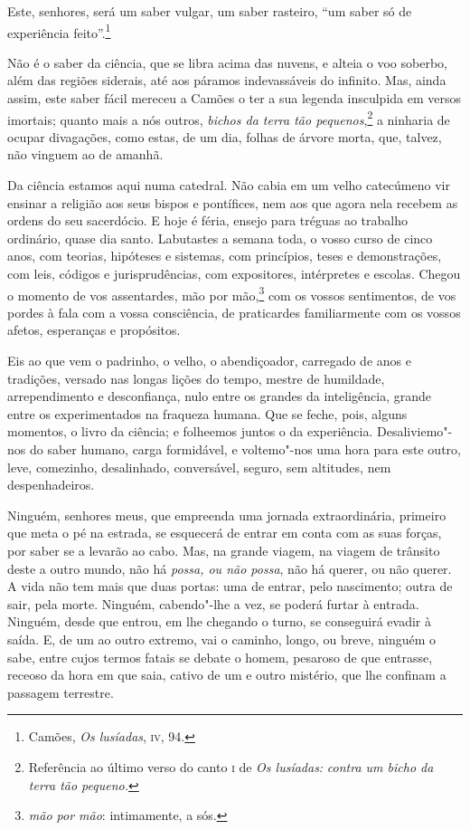Este, senhores, será um saber vulgar, um saber rasteiro,
``um saber só de experiência feito''.\footnote{ Camões,
\textit{Os lusíadas}, \textsc{iv}, 94.}


Não é o saber da ciência, que se libra acima das nuvens, e alteia
o voo soberbo, além das regiões siderais, até aos páramos indevassáveis
do infinito. Mas, ainda assim, este saber fácil mereceu a
Camões o ter a sua legenda insculpida
em versos imortais; quanto mais a nós outros, \textit{bichos da terra
tão pequenos},\footnote{ Referência ao último  verso do canto \textsc{i} de
\textit{Os lusíadas:} \textit{contra um bicho da terra tão
pequeno.}} a ninharia de ocupar divagações, como estas, de um
dia, folhas de árvore morta, que, talvez, não vinguem ao de amanhã.

Da ciência estamos aqui numa catedral. Não cabia em um velho
catecúmeno vir ensinar a religião aos seus bispos e pontífices, nem aos
que agora nela recebem as ordens do seu sacerdócio. E hoje é féria,
ensejo para tréguas ao trabalho ordinário, quase dia santo. Labutastes
a semana toda, o vosso curso de cinco anos, com teorias, hipóteses e
sistemas, com princípios, teses e demonstrações, com leis, códigos e
jurisprudências, com expositores, intérpretes e escolas. Chegou o
momento de vos assentardes, mão por mão,\footnote{ \textit{mão por mão}: 
intimamente, a sós.} com os vossos sentimentos, de vos
pordes à fala com a vossa consciência, de praticardes familiarmente com
os vossos afetos, esperanças e propósitos.

Eis ao que vem o padrinho, o velho, o abendiçoador, carregado de
anos e tradições, versado nas longas lições do tempo, mestre de
humildade, arrependimento e desconfiança, nulo entre os grandes da
inteligência, grande entre os experimentados na fraqueza humana. Que se
feche, pois, alguns momentos, o livro da ciência; e folheemos juntos o
da experiência. Desaliviemo"-nos do saber humano, carga formidável, e
voltemo"-nos uma hora para este outro, leve, comezinho, desalinhado,
conversável, seguro, sem altitudes, nem despenhadeiros.

Ninguém, senhores meus, que empreenda uma jornada extraordinária,
primeiro que meta o pé na estrada, se esquecerá de entrar em conta com
as suas forças, por saber se a levarão ao cabo. Mas, na grande viagem,
na viagem de trânsito deste a outro mundo, não há \textit{possa, ou não
possa}, não há querer, ou não querer. A vida não tem mais que duas
portas: uma de entrar, pelo nascimento; outra de sair, pela morte.
Ninguém, cabendo"-lhe a vez, se poderá furtar à entrada. Ninguém, desde
que entrou, em lhe chegando o turno, se conseguirá evadir à saída. E,
de um ao outro extremo, vai o caminho, longo, ou breve, ninguém o sabe,
entre cujos termos fatais se debate o homem, pesaroso de que entrasse,
receoso da hora em que saia, cativo de um e outro mistério, que lhe
confinam a passagem terrestre.

